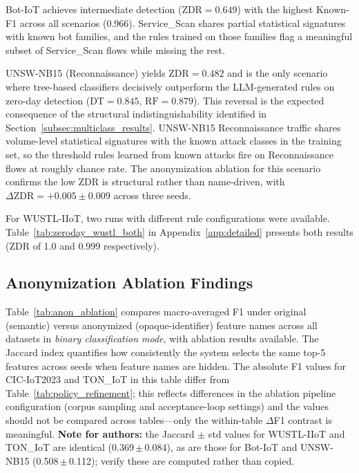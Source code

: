Bot-IoT achieves intermediate detection ($\text{ZDR} = 0.649$) with the highest Known-F1 across all scenarios ($0.966$). Service\_Scan shares partial statistical signatures with known bot families, and the rules trained on those families flag a meaningful subset of Service\_Scan flows while missing the rest.

UNSW-NB15 (Reconnaissance) yields $\text{ZDR} = 0.482$ and is the only scenario where tree-based classifiers decisively outperform the LLM-generated rules on zero-day detection ($\text{DT} = 0.845$, $\text{RF} = 0.879$). This reversal is the expected consequence of the structural indistinguishability identified in Section~\ref{subsec:multiclass_results}. UNSW-NB15 Reconnaissance traffic shares volume-level statistical signatures with the known attack classes in the training set, so the threshold rules learned from known attacks fire on Reconnaissance flows at roughly chance rate. The anonymization ablation for this scenario confirms the low ZDR is structural rather than name-driven, with $\Delta\text{ZDR} = {+0.005} \pm 0.009$ across three seeds.

For WUSTL-IIoT, two runs with different rule configurations were available. Table~\ref{tab:zeroday_wustl_both} in Appendix~\ref{app:detailed} presents both results (ZDR of 1.0 and 0.999 respectively).

\subsection{Anonymization Ablation Findings}
\label{subsec:anon_results}

Table~\ref{tab:anon_ablation} compares macro-averaged F1 under original (semantic) versus anonymized (opaque-identifier) feature names across all datasets in \emph{binary classification mode}, with ablation results available. The Jaccard index quantifies how consistently the system selects the same top-5 features across seeds when feature names are hidden. The absolute F1 values for CIC-IoT2023 and TON\_IoT in this table differ from Table~\ref{tab:policy_refinement}; this reflects differences in the ablation pipeline configuration (corpus sampling and acceptance-loop settings) and the values should not be compared across tables---only the within-table $\Delta$F1 contrast is meaningful. \textbf{Note for authors:} the Jaccard $\pm$ std values for WUSTL-IIoT and TON\_IoT are identical (0.369\,$\pm$\,0.084), as are those for Bot-IoT and UNSW-NB15 (0.508\,$\pm$\,0.112); verify these are computed rather than copied.

